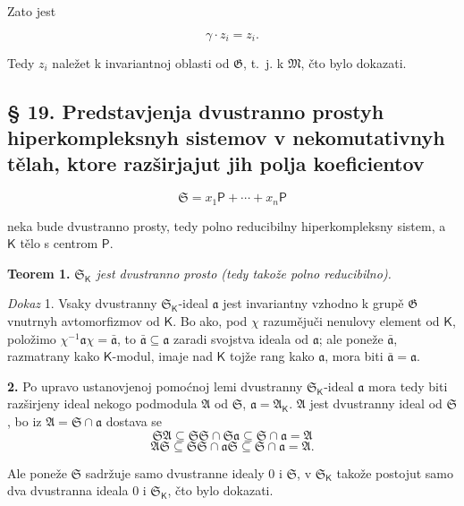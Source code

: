 \documentclass[11pt]{article}
\begin{document}
Zato jest

\[
\gamma\cdot z_i=z_i.
\]

Tedy \(z_i\) naležet k invariantnoj oblasti od \(\mathfrak G\), t.~j. k \(\mathfrak M\), čto bylo dokazati.

\subsection*{§ 19. Predstavjenja dvustranno prostyh hiperkompleksnyh sistemov v nekomutativnyh tělah, ktore razširjajut jih polja koeficientov}\label{darstellungen-zweiseitig-einfacher-hyperkomplexer-systeme-in-nichtkommutativen-erweiterungskoerpern-ihrer-koeffizientenkoerper}

\[
\mathfrak S=x_1\mathsf P+\cdots+x_n\mathsf P
\]

neka bude dvustranno prosty, tedy polno reducibilny hiperkompleksny sistem, a \(\mathsf K\) tělo s centrom \(\mathsf P\).

\textbf{Teorem 1.} \emph{\(\mathfrak S_{\mathsf K}\) jest dvustranno prosto (tedy takože polno reducibilno).}

\emph{Dokaz} 1. Vsaky dvustranny \(\mathfrak S_{\mathsf K}\)-ideal \(\mathfrak a\) jest invariantny vzhodno k grupě \(\mathfrak G\) vnutrnyh avtomorfizmov od \(\mathsf K\). Bo ako, pod \(\chi\) razumějuči nenulovy element od \(\mathsf K\), položimo \(\chi^{-1}\mathfrak a\chi=\bar{\mathfrak a}\), to \(\bar{\mathfrak a}\subseteq\mathfrak a\) zaradi svojstva ideala od \(\mathfrak a\); ale poneže \(\bar{\mathfrak a}\), razmatrany kako \(\mathsf K\)-modul, imaje nad \(\mathsf K\) tojže rang kako \(\mathfrak a\), mora biti \(\bar{\mathfrak a}=\mathfrak a\).

\textbf{2.} Po upravo ustanovjenoj pomoćnoj lemi dvustranny \(\mathfrak S_{\mathsf K}\)-ideal \(\mathfrak a\) mora tedy biti razširjeny ideal nekogo podmodula \(\mathfrak A\) od \(\mathfrak S\), \(\mathfrak a=\mathfrak A_{\mathsf K}\). \(\mathfrak A\) jest dvustranny ideal od \(\mathfrak S\), bo iz \(\mathfrak A=\mathfrak S\cap\mathfrak a\) dostava se
\[
\mathfrak S\mathfrak A\subseteq\mathfrak S\mathfrak S\cap\mathfrak S\mathfrak a\subseteq\mathfrak S\cap\mathfrak a=\mathfrak A
\]
\[
\mathfrak A\mathfrak S\subseteq\mathfrak S\mathfrak S\cap\mathfrak a\mathfrak S\subseteq\mathfrak S\cap\mathfrak a=\mathfrak A.
\]

Ale poneže \(\mathfrak S\) sadržuje samo dvustranne idealy 0 i \(\mathfrak S\), v \(\mathfrak S_{\mathsf K}\) takože postojut samo dva dvustranna ideala 0 i \(\mathfrak S_{\mathsf K}\), čto bylo dokazati.
\end{document}
